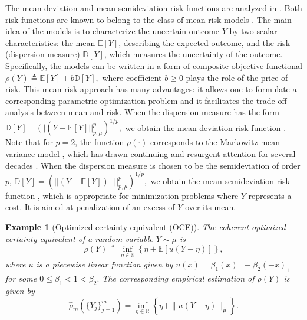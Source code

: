 \documentclass[12pt,technote,onecolumn]{IEEEtran}
\newtheorem{example}{Example}
\begin{document}
The mean-deviation and mean-semideviation risk functions are analyzed in \cite{ogryczak1999stochastic,ogryczak2001consistency,Ruszczynski:2006uq,ruszczynski2006conditional}. Both risk functions are known to belong to the class of mean-risk models \cite{shapiro2014lectures}. The main idea of the models is to characterize the uncertain outcome $Y$ by two scalar characteristics: the mean $\mathbb{E}[Y]$, describing the expected outcome, and the risk (dispersion measure) $\mathbb{D}[Y]$, which measures the uncertainty of the outcome. Specifically, the models can be written in a form of composite objective functional 
$\rho(Y)\triangleq\mathbb{E}[Y]+b\mathbb{D}[Y],$ where coefficient $b\geq0$ plays the role of the price of risk. This mean-risk approach has many advantages: it allows one to formulate a corresponding parametric optimization problem and it facilitates the trade-off analysis between mean and risk.	When the dispersion measure has the form $\mathbb{D}[Y]=(||(Y-\mathbb{E}[Y]||^p_{p,\mu})^{1/p},$ we obtain the mean-deviation risk function \cite[Example 4.1]{Ruszczynski:2006uq}.	Note that for $p=2$, the function $\rho(\cdot)$ corresponds to the Markowitz mean-variance model \cite{markowitz1968portfolio}, which has drawn continuing and resurgent attention for several decades \cite{markowitz2000mean,bielecki2005continuous,costa2010sampled,yin2004markowitz}. When the dispersion measure is chosen to be the semideviation of order $p$, $\mathbb{D}[Y]=(||(Y-\mathbb{E}[Y])_+||^p_{p,\mu})^{1/p},$ we obtain the mean-semideviation risk function \cite[Example 4.2]{Ruszczynski:2006uq}, which is appropriate for minimization problems where $Y$ represents a cost. It is aimed at penalization of an excess of $Y$ over its mean.
	
	\begin{example}[Optimized certainty equivalent (OCE)]
		The coherent optimized certainty equivalent \cite{ben2007old} of a random variable $Y\sim\mu$ is 		
		\[
		\rho\left(Y\right)\triangleq\inf_{\eta\in\mathbb{R}}\left\{ \eta+\mathbb{E}\left[u\left(Y-\eta\right)\right]\right\} ,
		\]
		where $u$ is a piecewise linear function given by $u(x)=\beta_1(x)_+-\beta_2(-x)_+$	for some $0\leq\beta_{1}<1<\beta_{2}.$ The corresponding empirical estimation of $\rho(Y)$ is given by 
		$$\hat{\rho}_{m}\left(\{Y_j\}^m_{j=1}\right)=
		\inf_{\eta\in\mathbb{R}}\left\{ \eta+\|u\left(Y-\eta\right)\|_{\hat{\mu}}\right\} .
		$$
	\end{example}
\end{document}

